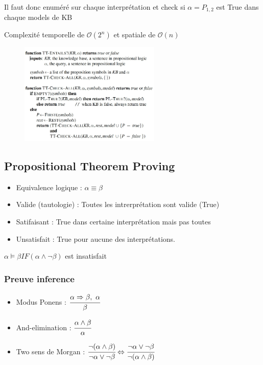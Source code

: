 \documentclass[12pt]{article}
\begin{document}
			Il faut donc enuméré sur chaque interprétation et check si $\alpha = P_{1,2}$ est True dans chaque models de KB
			
			Complexité temporelle de $\mathcal{O}(2^n)$ et spatiale de $\mathcal{O}(n)$
			
			\begin{figure}[htp]	
				\centering
				\includegraphics[width=0.6\textwidth]{img/KBA5.png}
			\end{figure}
			
	\subsection{Propositional Theorem Proving}
		\begin{itemize}
			\item Equivalence logique : $\alpha \equiv \beta$
			\item Valide (tautologie) : Toutes les intrerprétation sont valide (True)
			\item Satifaisant : True dans certaine interprétation mais pas toutes
			\item Unsatisfait : True pour aucune des interprétations.
			
		\end{itemize}
		
		$\alpha \models \beta IF (\alpha \wedge \neg\beta)$ est insatisfait
			
		\subsubsection{Preuve inference}
			\begin{itemize}
				\item Modus Ponens : $\cfrac{\alpha \Rightarrow \beta, \ \alpha}{\beta}$
				\item And-elimination : $\cfrac{\alpha \wedge \beta}{\alpha}$
				\item Two sens de Morgan : $\cfrac{\neg(\alpha\wedge\beta)}{\neg \alpha \vee \neg \beta} \Leftrightarrow \cfrac{\neg \alpha\vee\neg\beta}{\neg (\alpha \wedge\beta)}$

			\end{itemize}
			
\end{document}
